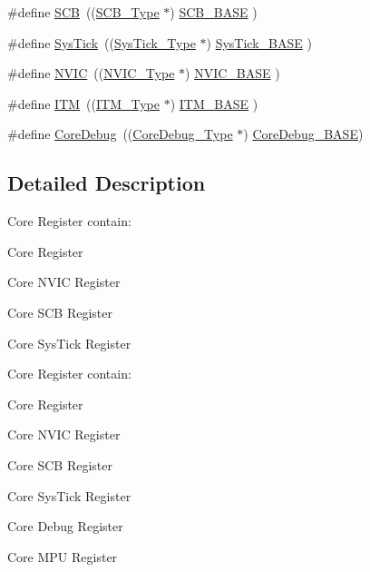 \begin{DoxyCompactItemize}
\#define \hyperlink{group___c_m_s_i_s__core__register_gaaaf6477c2bde2f00f99e3c2fd1060b01}{S\-C\-B}~((\hyperlink{struct_s_c_b___type}{S\-C\-B\-\_\-\-Type}       $\ast$)     \hyperlink{group___c_m_s_i_s__core__register_gad55a7ddb8d4b2398b0c1cfec76c0d9fd}{S\-C\-B\-\_\-\-B\-A\-S\-E}      )
\item 
\#define \hyperlink{group___c_m_s_i_s__core__register_gacd96c53beeaff8f603fcda425eb295de}{Sys\-Tick}~((\hyperlink{struct_sys_tick___type}{Sys\-Tick\-\_\-\-Type}   $\ast$)     \hyperlink{group___c_m_s_i_s__core__register_ga58effaac0b93006b756d33209e814646}{Sys\-Tick\-\_\-\-B\-A\-S\-E}  )
\item 
\#define \hyperlink{group___c_m_s_i_s__core__register_gac8e97e8ce56ae9f57da1363a937f8a17}{N\-V\-I\-C}~((\hyperlink{struct_n_v_i_c___type}{N\-V\-I\-C\-\_\-\-Type}      $\ast$)     \hyperlink{group___c_m_s_i_s__core__register_gaa0288691785a5f868238e0468b39523d}{N\-V\-I\-C\-\_\-\-B\-A\-S\-E}     )
\item 
\#define \hyperlink{group___c_m_s_i_s__core__register_gabae7cdf882def602cb787bb039ff6a43}{I\-T\-M}~((\hyperlink{struct_i_t_m___type}{I\-T\-M\-\_\-\-Type}       $\ast$)     \hyperlink{group___c_m_s_i_s__core__register_gadd76251e412a195ec0a8f47227a8359e}{I\-T\-M\-\_\-\-B\-A\-S\-E}      )
\item 
\#define \hyperlink{group___c_m_s_i_s__core__register_gab6e30a2b802d9021619dbb0be7f5d63d}{Core\-Debug}~((\hyperlink{struct_core_debug___type}{Core\-Debug\-\_\-\-Type} $\ast$)     \hyperlink{group___c_m_s_i_s__core__register_ga680604dbcda9e9b31a1639fcffe5230b}{Core\-Debug\-\_\-\-B\-A\-S\-E})
\end{DoxyCompactItemize}


\subsection{Detailed Description}
Core Register contain\-:
\begin{DoxyItemize}
\item Core Register
\item Core N\-V\-I\-C Register
\item Core S\-C\-B Register
\item Core Sys\-Tick Register
\end{DoxyItemize}

Core Register contain\-:
\begin{DoxyItemize}
\item Core Register
\item Core N\-V\-I\-C Register
\item Core S\-C\-B Register
\item Core Sys\-Tick Register
\item Core Debug Register
\item Core M\-P\-U Register
\end{DoxyItemize}

